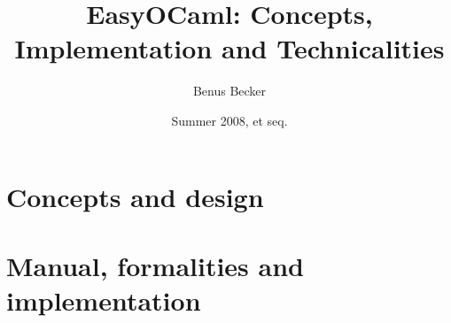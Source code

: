 \documentclass[11pt,titlepage,abstracton]{scrartcl} %
\title{EasyOCaml: Concepts, Implementation and Technicalities}
\author{Benus Becker}
\date{Summer 2008, et seq.}
\begin{document}



\clearpage \part{Concepts and design} \label{part:concepts}




\clearpage \part{Manual, formalities and implementation} \label{part:implem}

\clearpage
\clearpage
\clearpage

\clearpage
\end{document}
